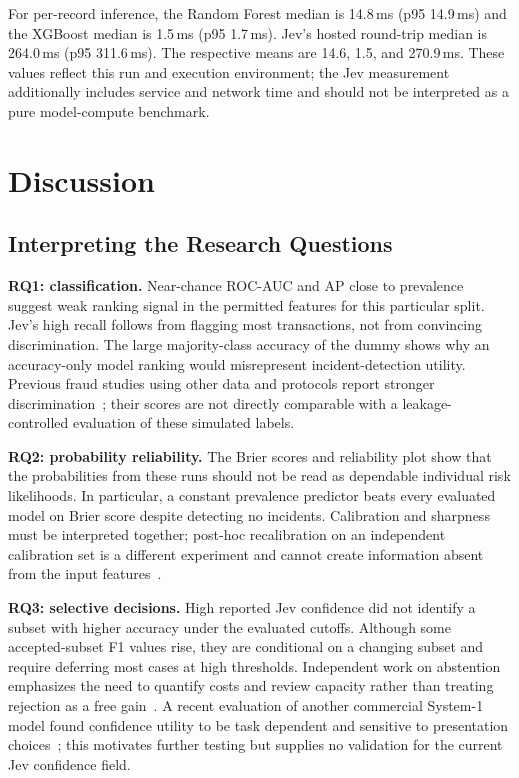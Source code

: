 \documentclass{llncs}
\begin{document}
For per-record inference, the Random Forest median is 14.8\,ms (p95 14.9\,ms) and the XGBoost median is 1.5\,ms (p95 1.7\,ms). Jev's hosted round-trip median is 264.0\,ms (p95 311.6\,ms). The respective means are 14.6, 1.5, and 270.9\,ms. These values reflect this run and execution environment; the Jev measurement additionally includes service and network time and should not be interpreted as a pure model-compute benchmark.

\section{Discussion}

\subsection{Interpreting the Research Questions}

\textbf{RQ1: classification.} Near-chance ROC-AUC and AP close to prevalence suggest weak ranking signal in the permitted features for this particular split. Jev's high recall follows from flagging most transactions, not from convincing discrimination. The large majority-class accuracy of the dummy shows why an accuracy-only model ranking would misrepresent incident-detection utility. Previous fraud studies using other data and protocols report stronger discrimination~\cite{han2026fusion,fazel2026ebm}; their scores are not directly comparable with a leakage-controlled evaluation of these simulated labels.

\textbf{RQ2: probability reliability.} The Brier scores and reliability plot show that the probabilities from these runs should not be read as dependable individual risk likelihoods. In particular, a constant prevalence predictor beats every evaluated model on Brier score despite detecting no incidents. Calibration and sharpness must be interpreted together; post-hoc recalibration on an independent calibration set is a different experiment and cannot create information absent from the input features~\cite{chidambaram2025reassessing,haotian2023recal}.

\textbf{RQ3: selective decisions.} High reported Jev confidence did not identify a subset with higher accuracy under the evaluated cutoffs. Although some accepted-subset F1 values rise, they are conditional on a changing subset and require deferring most cases at high thresholds. Independent work on abstention emphasizes the need to quantify costs and review capacity rather than treating rejection as a free gain~\cite{singh2026abstention}. A recent evaluation of another commercial System-1 model found confidence utility to be task dependent and sensitive to presentation choices~\cite{provatas2026systemone}; this motivates further testing but supplies no validation for the current Jev confidence field.
\end{document}
